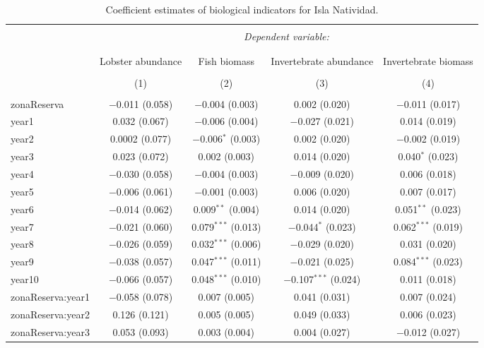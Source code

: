 \documentclass[utf8]{frontiers_suppmat} %
\theoremstyle{definition}
\theoremstyle{definition}
\theoremstyle{definition}
\theoremstyle{remark}
\begin{document}
\begin{table}[!htbp] \centering 
  \caption{Coefficient estimates of biological indicators for Isla Natividad.} 
  \label{} 
\tiny 
\begin{tabular}{@{\extracolsep{1pt}}lcccc} 
\\[-1.8ex]\hline 
\hline \\[-1.8ex] 
 & \multicolumn{4}{c}{\textit{Dependent variable:}} \\ 
\cline{2-5} 
\\[-1.8ex] & \multicolumn{4}{c}{} \\ 
 & Lobster abundance & Fish biomass & Invertebrate abundance & Invertebrate biomass \\ 
\\[-1.8ex] & (1) & (2) & (3) & (4)\\ 
\hline \\[-1.8ex] 
 zonaReserva & $-$0.011 (0.058) & $-$0.004 (0.003) & 0.002 (0.020) & $-$0.011 (0.017) \\ 
  year1 & 0.032 (0.067) & $-$0.006 (0.004) & $-$0.027 (0.021) & 0.014 (0.019) \\ 
  year2 & 0.0002 (0.077) & $-$0.006$^{*}$ (0.003) & 0.002 (0.020) & $-$0.002 (0.019) \\ 
  year3 & 0.023 (0.072) & 0.002 (0.003) & 0.014 (0.020) & 0.040$^{*}$ (0.023) \\ 
  year4 & $-$0.030 (0.058) & $-$0.004 (0.003) & $-$0.009 (0.020) & 0.006 (0.018) \\ 
  year5 & $-$0.006 (0.061) & $-$0.001 (0.003) & 0.006 (0.020) & 0.007 (0.017) \\ 
  year6 & $-$0.014 (0.062) & 0.009$^{**}$ (0.004) & 0.014 (0.020) & 0.051$^{**}$ (0.023) \\ 
  year7 & $-$0.021 (0.060) & 0.079$^{***}$ (0.013) & $-$0.044$^{*}$ (0.023) & 0.062$^{***}$ (0.019) \\ 
  year8 & $-$0.026 (0.059) & 0.032$^{***}$ (0.006) & $-$0.029 (0.020) & 0.031 (0.020) \\ 
  year9 & $-$0.038 (0.057) & 0.047$^{***}$ (0.011) & $-$0.021 (0.025) & 0.084$^{***}$ (0.023) \\ 
  year10 & $-$0.066 (0.057) & 0.048$^{***}$ (0.010) & $-$0.107$^{***}$ (0.024) & 0.011 (0.018) \\ 
  zonaReserva:year1 & $-$0.058 (0.078) & 0.007 (0.005) & 0.041 (0.031) & 0.007 (0.024) \\ 
  zonaReserva:year2 & 0.126 (0.121) & 0.005 (0.005) & 0.049 (0.033) & 0.006 (0.023) \\ 
  zonaReserva:year3 & 0.053 (0.093) & 0.003 (0.004) & 0.004 (0.027) & $-$0.012 (0.027) \\ 

\end{tabular}
\end{table}
\end{document}
